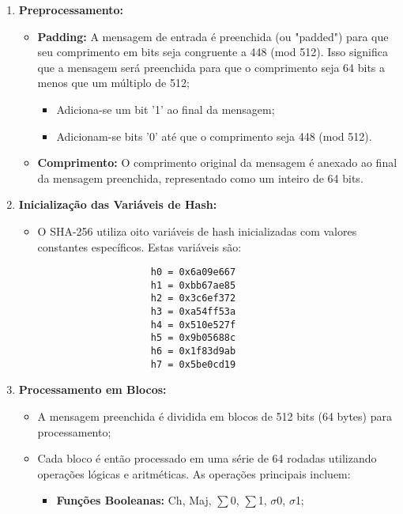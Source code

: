 \documentclass[a4paper,12pt]{article}
\begin{document}
\begin{enumerate}
    \item \textbf{Preprocessamento:}
        \begin{itemize}
            \item \textbf{Padding:} A mensagem de entrada é preenchida (ou "padded") para que seu comprimento em bits seja congruente a 448 (mod 512). Isso significa que a mensagem será preenchida para que o comprimento seja 64 bits a menos que um múltiplo de 512;
                \begin{itemize}
                    \item Adiciona-se um bit '1' ao final da mensagem;
                    \item Adicionam-se bits '0' até que o comprimento seja 448 (mod 512).
                \end{itemize}
            \item \textbf{Comprimento:} O comprimento original da mensagem é anexado ao final da mensagem preenchida, representado como um inteiro de 64 bits.
        \end{itemize}
    \item \textbf{Inicialização das Variáveis de Hash:}
        \begin{itemize}
            \item O SHA-256 utiliza oito variáveis de hash inicializadas com valores constantes específicos. Estas variáveis são:
                \begin{lstlisting}
                    h0 = 0x6a09e667
                    h1 = 0xbb67ae85
                    h2 = 0x3c6ef372
                    h3 = 0xa54ff53a
                    h4 = 0x510e527f
                    h5 = 0x9b05688c
                    h6 = 0x1f83d9ab
                    h7 = 0x5be0cd19
                \end{lstlisting}
        \end{itemize}
    \item \textbf{Processamento em Blocos:}
        \begin{itemize}
            \item A mensagem preenchida é dividida em blocos de 512 bits (64 bytes) para processamento;
            \item Cada bloco é então processado em uma série de 64 rodadas utilizando operações lógicas e aritméticas. As operações principais incluem:
                \begin{itemize}
                    \item \textbf{Funções Booleanas:} Ch, Maj, \(\sum\)0, \(\sum\)1, \(\sigma\)0, \(\sigma\)1;

\end{itemize}
\end{itemize}
\end{enumerate}
\end{document}
